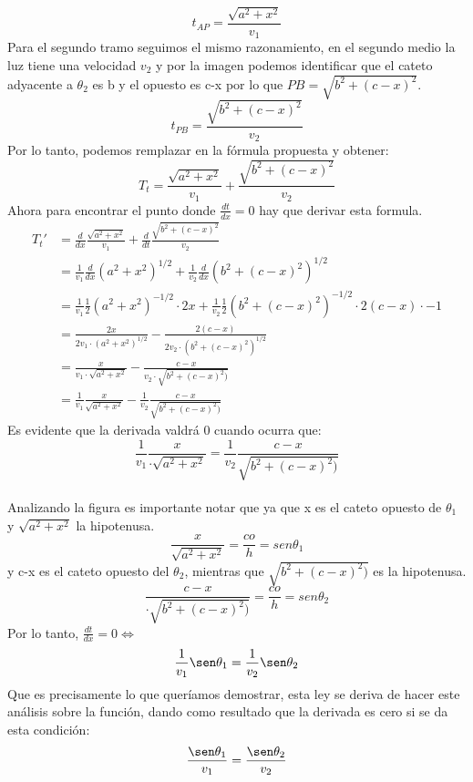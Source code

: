 \documentclass[12pt]{article}
\begin{document}
\[
t_{AP}= \frac{\sqrt{a^2+x^2}}{v_1}
\]
Para el segundo tramo seguimos el mismo razonamiento, en el segundo medio la luz tiene una velocidad $v_2$ y por la imagen podemos identificar que el cateto adyacente a $\theta_2$ es b y el opuesto es c-x por lo que $PB= \sqrt{b^2 + (c-x)^2}$.
\[
t_{PB}= \frac{\sqrt{b^2 + (c-x)^2}}{v_2}
\]
Por lo tanto, podemos remplazar en la fórmula propuesta y obtener:
\[
T_t= \frac{\sqrt{a^2+x^2}}{v_1} +  \frac{\sqrt{b^2 + (c-x)^2}}{v_2}
\]
Ahora para encontrar el punto donde $\frac{dt}{dx}=0$ hay que derivar esta formula.
\begin{align*}
  T_t'
  &=  \frac{d}{dx} \frac{\sqrt{a^2+x^2}}{v_1} +  \frac{d}{dt} \frac{\sqrt{b^2 + (c-x)^2}}{v_2}\\
  &= \frac{1}{v_1} \frac{d}{dx} (a^2+x^2)^{1/2}+\frac{1}{v_2} \frac{d}{dx}  (b^2 +(c-x)^2)^{1/2}\\
  &= \frac{1}{v_1} \frac{1}{2} (a^2+x^2)^{-1/2} \cdot 2x + \frac{1}{v_2} \frac{1}{2}  (b^2 +(c-x)^2)^{-1/2} \cdot 2(c-x) \cdot -1\\
  &= \frac{2x}{2v_1  \cdot (a^{2} + x^{2})^{1/2}}  - \frac{2(c-x)}{2v_2\cdot (b^2 +(c-x)^2)^{1/2} }\\
  &= \frac{x}{v_1  \cdot \sqrt{a^{2} + x^{2}}}  - \frac{c-x}{v_2\cdot \sqrt {b^2 +(c-x)^2)} } \\
  &= \frac{1}{v_1}\frac{x}{  \sqrt{a^{2} + x^{2}}}  - \frac{1}{v_2}\frac{c-x}{ \sqrt {b^2 +(c-x)^2)} } 
\end{align*}
Es evidente que la derivada valdrá 0 cuando ocurra que:
\[
 \frac{1}{v_1}\frac{x}{ \cdot \sqrt{a^{2} + x^{2}}}  =  \frac{1}{v_2}\frac{c-x}{ \sqrt {b^2 +(c-x)^2)} }  
 \]
 \\
Analizando la figura es importante notar que ya que x es el cateto opuesto de $\theta_1$ y  $\sqrt{a^{2} + x^{2}} $ la hipotenusa.
\[
\frac{x}{  \sqrt{a^{2} + x^{2}}} = \frac{co}{h} = sen\theta_1
\]
y c-x es el cateto opuesto del  $\theta_2$, mientras que $\sqrt {b^2 +(c-x)^2)}$ es la hipotenusa.
\[
\frac{c-x}{\cdot \sqrt {b^2 +(c-x)^2)} }  = \frac{co}{h} = sen\theta_2  
\]
Por lo tanto, $\frac{dt}{dx}=0 \iff$
\[
 \frac{1}{v_1}\sen\theta_1  =  \frac{1}{v_2}\sen\theta_2
 \]
 Que es precisamente lo que queríamos demostrar, esta ley se deriva de hacer este análisis sobre la función, dando como resultado que la derivada es cero si se da esta condición:
 \[
 \frac{\sen\theta_1}{v_1}  =  \frac{\sen\theta_2}{v_2}
 \]
\end{document}
